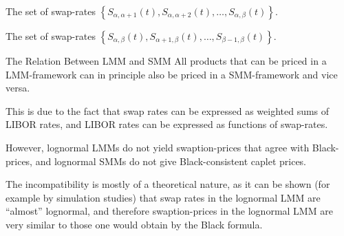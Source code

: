 	The set of swap-rates 
	$ \left\{
	S_{\alpha,\alpha+1}(t),S_{\alpha,\alpha+2}(t),\dots,S_{\alpha,\beta}(t)\right\}.
	$  
	
	The set of swap-rates 
	$ \left\{
	S_{\alpha,\beta}(t),S_{\alpha+1,\beta}(t),\dots,S_{\beta-1,\beta}(t)\right\}.$


The Relation Between LMM and SMM
	All products that can be priced in a
	LMM-framework can in principle also be priced in a SMM-framework
	and vice versa.
	
	This is due to the fact that swap rates can be
	expressed as weighted sums of LIBOR rates, and LIBOR rates can be
	expressed as functions of swap-rates.
	
	However, lognormal LMMs do not yield
	swaption-prices that agree with Black-prices, and
	lognormal SMMs do not give Black-consistent caplet prices.
	
	The incompatibility is mostly of a theoretical nature, as it can
	be shown (for example by simulation studies) that swap rates in
	the lognormal LMM are ``almost'' lognormal, and therefore
	swaption-prices in the lognormal LMM
	are very similar to those one would obtain by the Black formula.

